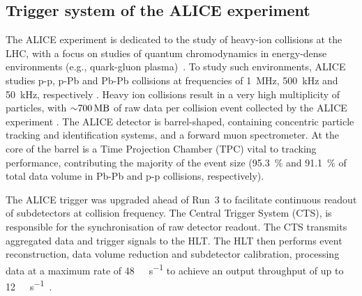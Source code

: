 \subsection{Trigger system of the ALICE experiment}
The ALICE experiment is dedicated to the study of heavy-ion collisions at the LHC, with a focus on studies of quantum chromodynamics in energy-dense environments (e.g.,  quark-gluon plasma)~\cite{alice-performance-paper-run1}. To study such environments, ALICE studies p-p, p-Pb and Pb-Pb collisions at frequencies of \SI{1}{\mega\hertz}, \SI{500}{\kilo\hertz} and \SI{50}{\kilo\hertz}, respectively \cite{alice-trigger-run3}. Heavy ion collisions result in a very high multiplicity of particles, with ${\sim}\SI{700}{\mega\byte}$ of raw data per collision event collected by the ALICE experiment \cite{alice-rta-trigger}. The ALICE detector is barrel-shaped, containing concentric particle tracking and identification systems, and a forward muon spectrometer. At the core of the barrel is a Time Projection Chamber (TPC) vital to tracking performance, contributing the majority of the event size (\SI{95.3}{\percent} and \SI{91.1}{\percent} of total data volume in Pb-Pb and p-p collisions, respectively).

The ALICE trigger was upgraded ahead of Run~3 to facilitate continuous readout of subdetectors at collision frequency. The Central Trigger System (CTS), is responsible for the synchronisation of raw detector readout. The CTS transmits aggregated data and trigger signals to the HLT. The HLT then performs event reconstruction, data volume reduction and subdetector calibration, processing data at a maximum rate of \SI{48}{\giga\byte\per\second} to achieve an output throughput of up to \SI{12}{\giga\byte\per\second}~\cite{alice-rta-trigger}.
